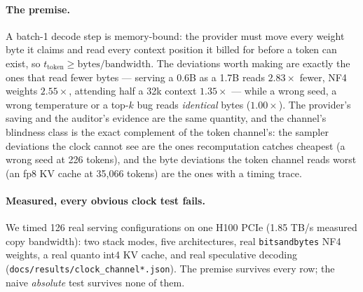 \documentclass[11pt]{article}
\begin{document}
\paragraph{The premise.} A batch-1 decode step is memory-bound: the provider must
move every weight byte it claims and read every context position it billed for
before a token can exist, so $t_{\text{token}} \ge \text{bytes}/\text{bandwidth}$.
The deviations worth making are exactly the ones that read fewer bytes ---
serving a 0.6B as a 1.7B reads $2.83\times$ fewer, NF4 weights $2.55\times$,
attending half a 32k context $1.35\times$ --- while a wrong seed, a wrong
temperature or a top-$k$ bug reads \emph{identical} bytes ($1.00\times$). The
provider's saving and the auditor's evidence are the same quantity, and the
channel's blindness class is the exact complement of the token channel's: the
sampler deviations the clock cannot see are the ones recomputation catches
cheapest (a wrong seed at 226 tokens), and the byte deviations the token channel
reads worst (an fp8 KV cache at 35{,}066 tokens) are the ones with a timing trace.

\paragraph{Measured, every obvious clock test fails.} We timed 126 real serving
configurations on one H100 PCIe (1.85 TB/s measured copy bandwidth): two stack
modes, five architectures, real \texttt{bitsandbytes} NF4 weights, a real quanto
int4 KV cache, and real speculative decoding
(\texttt{docs/results/clock\_channel*.json}). The premise survives every row; the
naive \emph{absolute} test survives none of them.
\end{document}
